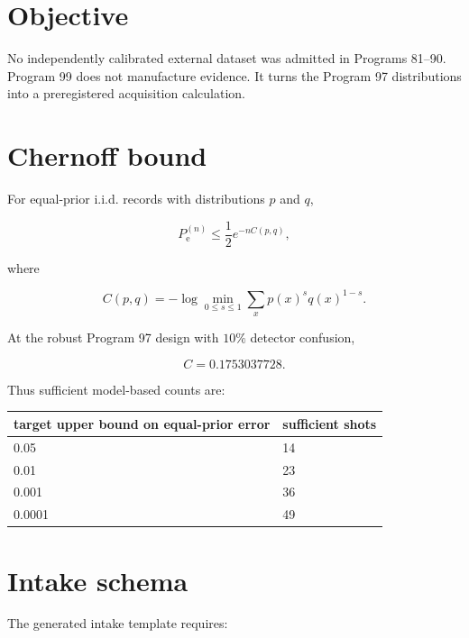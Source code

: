 \documentclass[11pt,a4paper,openany]{report}
\begin{document}
\section{Objective}

No independently calibrated external dataset was admitted in Programs 81--90. Program 99 does not manufacture evidence. It turns the Program 97 distributions into a preregistered acquisition calculation.

\section{Chernoff bound}

For equal-prior i.i.d. records with distributions \(p\) and \(q\),

\[
P_{\mathrm e}^{(n)}
\le
\frac12e^{-nC(p,q)},
\]

where

\[
C(p,q)
=
-\log
\min_{0\le s\le1}
\sum_x p(x)^s q(x)^{1-s}.
\]

At the robust Program 97 design with \(10\%\) detector confusion,

\[
C=0.1753037728.
\]

Thus sufficient model-based counts are:

\begin{center}
\begingroup\small
\setlength{\tabcolsep}{3.5pt}
\renewcommand{\arraystretch}{1.16}
\begin{longtable}{@{}p{}p{}@{}}
\toprule
\textbf{target upper bound on equal-prior error} & \textbf{sufficient shots} \\
\midrule
\endhead
0.05 & 14 \\
0.01 & 23 \\
0.001 & 36 \\
0.0001 & 49 \\
\bottomrule
\end{longtable}
\endgroup
\end{center}

\section{Intake schema}

The generated intake template requires:
\end{document}
